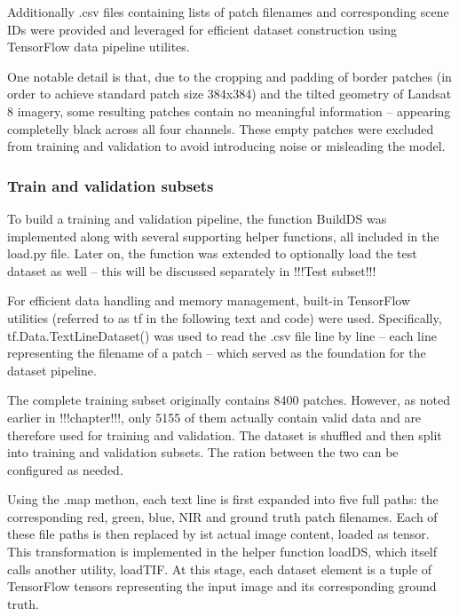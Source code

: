 {

Additionally .csv files containing lists of patch filenames and corresponding scene IDs were provided and leveraged for efficient dataset construction using TensorFlow data pipeline utilites.

One notable detail is that, due to the cropping and padding of border patches (in order to achieve standard patch size 384x384) and the tilted geometry of Landsat 8 imagery, some resulting patches contain no meaningful information – appearing completelly black across all four channels. These empty patches were excluded from training and validation to avoid introducing noise or misleading the model.

\subsubsection{Train and validation subsets}

To build a training and validation pipeline, the function BuildDS was implemented along with several supporting helper functions, all included in the load.py file. Later on, the function was extended to optionally load the test dataset as well – this will be discussed separately in !!!Test subset!!!

For efficient data handling and memory management, built-in TensorFlow utilities (referred to as tf in the following text and code) were used. Specifically, tf.Data.TextLineDataset() was used to read the .csv file line by line – each line representing the filename of a patch – which served as the foundation for the dataset pipeline.

The complete training subset originally contains 8400 patches. However, as noted earlier in !!!chapter!!!, only 5155 of them actually contain valid data and are therefore used for training and validation. The dataset is shuffled and then split into training and validation subsets. The ration between the two can be configured as needed.

Using the .map methon, each text line is first expanded into five full paths: the corresponding red, green, blue, NIR and ground truth patch filenames. Each of these file paths is then replaced by ist actual image content, loaded as tensor. This transformation is implemented in the helper function loadDS, which itself calls another utility, loadTIF. At this stage, each dataset element is a tuple of TensorFlow tensors representing the input image and its corresponding ground truth.

}
